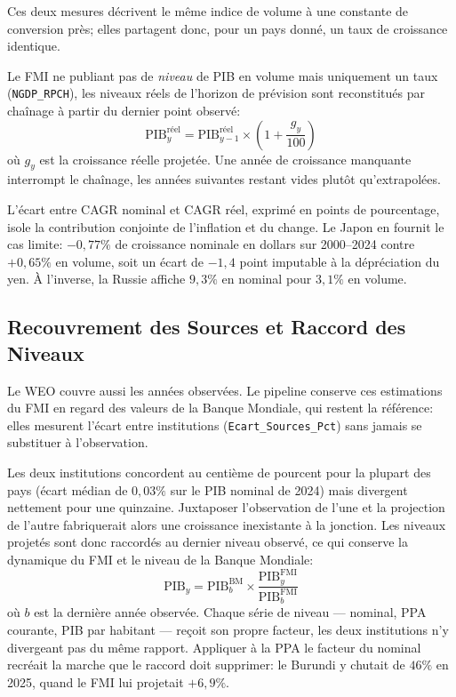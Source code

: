 \documentclass[11pt,a4paper]{article}
\begin{document}
Ces deux mesures décrivent le même indice de volume à une constante de conversion près; elles partagent donc, pour un pays donné, un taux de croissance identique.

Le FMI ne publiant pas de \emph{niveau} de PIB en volume mais uniquement un taux (\texttt{NGDP\_RPCH}), les niveaux réels de l'horizon de prévision sont reconstitués par chaînage à partir du dernier point observé:
\begin{equation}
\text{PIB}^{\text{réel}}_{y} = \text{PIB}^{\text{réel}}_{y-1} \times \left(1 + \frac{g_{y}}{100}\right)
\end{equation}
où $g_{y}$ est la croissance réelle projetée. Une année de croissance manquante interrompt le chaînage, les années suivantes restant vides plutôt qu'extrapolées.

L'écart entre CAGR nominal et CAGR réel, exprimé en points de pourcentage, isole la contribution conjointe de l'inflation et du change. Le Japon en fournit le cas limite: $-0{,}77\%$ de croissance nominale en dollars sur 2000--2024 contre $+0{,}65\%$ en volume, soit un écart de $-1{,}4$ point imputable à la dépréciation du yen. À l'inverse, la Russie affiche $9{,}3\%$ en nominal pour $3{,}1\%$ en volume.

\subsection{Recouvrement des Sources et Raccord des Niveaux}
Le WEO couvre aussi les années observées. Le pipeline conserve ces estimations du FMI en regard des valeurs de la Banque Mondiale, qui restent la référence: elles mesurent l'écart entre institutions (\texttt{Ecart\_Sources\_Pct}) sans jamais se substituer à l'observation.

Les deux institutions concordent au centième de pourcent pour la plupart des pays (écart médian de $0{,}03\%$ sur le PIB nominal de 2024) mais divergent nettement pour une quinzaine. Juxtaposer l'observation de l'une et la projection de l'autre fabriquerait alors une croissance inexistante à la jonction. Les niveaux projetés sont donc raccordés au dernier niveau observé, ce qui conserve la dynamique du FMI et le niveau de la Banque Mondiale:
\begin{equation}
\text{PIB}_{y} = \text{PIB}^{\text{BM}}_{b} \times \frac{\text{PIB}^{\text{FMI}}_{y}}{\text{PIB}^{\text{FMI}}_{b}}
\end{equation}
où $b$ est la dernière année observée. Chaque série de niveau --- nominal, PPA courante, PIB par habitant --- reçoit son propre facteur, les deux institutions n'y divergeant pas du même rapport. Appliquer à la PPA le facteur du nominal recréait la marche que le raccord doit supprimer: le Burundi y chutait de $46\%$ en 2025, quand le FMI lui projetait $+6{,}9\%$.
\end{document}
